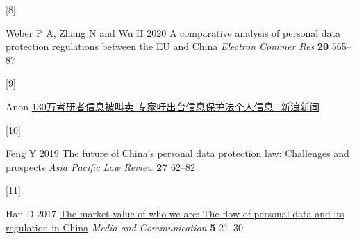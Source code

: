 \documentclass[
]{article}
\newlength{\cslhangindent}
\newlength{\csllabelwidth}
\newlength{\cslentryspacingunit} %
\newenvironment{CSLReferences}[2] %
 {%
  \setlength{\parindent}{0pt}
  \ifodd #1
  \let\oldpar\par
  \def\par{\hangindent=\cslhangindent\oldpar}
  \fi
  \setlength{\parskip}{#2\cslentryspacingunit}
 }%
 {}
\newcommand{\CSLLeftMargin}[1]{\parbox[t]{\csllabelwidth}{#1}}
\newcommand{\CSLRightInline}[1]{\parbox[t]{\linewidth - \csllabelwidth}{#1}\break}
\begin{document}
\begin{CSLReferences}{0}{0}
\leavevmode{}%
\CSLLeftMargin{{[}8{]} }%
\CSLRightInline{Weber P A, Zhang N and Wu H 2020
\href{https://doi.org/10.1007/s10660-020-09422-3}{A comparative analysis
of personal data protection regulations between the {EU} and {China}}
\emph{Electron Commer Res} \textbf{20} 565--87}

\leavevmode{}%
\CSLLeftMargin{{[}9{]} }%
\CSLRightInline{Anon
\href{http://news.sina.com.cn/c/2014-12-10/032331266499.shtml}{130万考研者信息被叫卖
专家吁出台信息保护法{\textbar}个人信息\_新浪新闻}}

\leavevmode{}%
\CSLLeftMargin{{[}10{]} }%
\CSLRightInline{Feng Y 2019
\href{https://doi.org/10.1080/10192557.2019.1646015}{The future of
{China}'s personal data protection law: Challenges and prospects}
\emph{Asia Pacific Law Review} \textbf{27} 62--82}

\leavevmode{}%
\CSLLeftMargin{{[}11{]} }%
\CSLRightInline{Han D 2017
\href{https://doi.org/10.17645/mac.v5i2.890}{The market value of who we
are: The flow of personal data and its regulation in {China}}
\emph{Media and Communication} \textbf{5} 21--30}

\end{CSLReferences}
\end{document}
